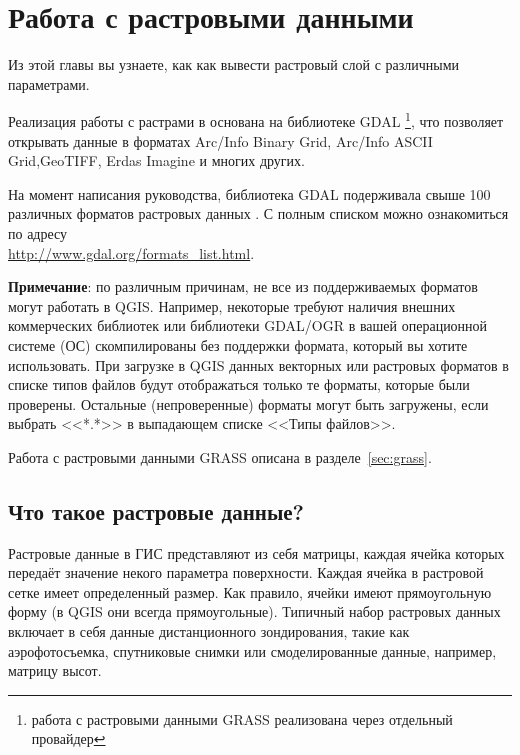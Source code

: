 \chapter{Работа с растровыми данными}\label{label_raster}


Из этой главы вы узнаете, как как вывести растровый слой с различными параметрами.

Реализация работы с растрами в \qg основана на библиотеке GDAL
\footnote{работа с растровыми данными GRASS реализована через отдельный
провайдер}, что позволяет открывать данные в форматах Arc/Info Binary Grid,
Arc/Info ASCII Grid,GeoTIFF,
Erdas Imagine и многих других.

На момент написания руководства, библиотека GDAL подерживала свыше 100
различных форматов растровых данных \cite{GDALweb}. С полным списком можно
ознакомиться по адресу \\
\url{http://www.gdal.org/formats_list.html}.

\textbf{Примечание}: по различным причинам, не все из поддерживаемых
форматов могут работать в QGIS. Например, некоторые требуют наличия
внешних коммерческих библиотек или библиотеки GDAL/OGR в вашей операционной
системе (ОС) скомпилированы без поддержки формата, который вы хотите
использовать. При загрузке в QGIS данных векторных или растровых форматов
в списке типов файлов будут отображаться только те форматы, которые были
проверены. Остальные (непроверенные) форматы могут быть загружены, если
выбрать <<*.*>> в выпадающем списке <<Типы файлов>>.

Работа с растровыми данными GRASS описана в разделе~\ref{sec:grass}.

\section{Что такое растровые данные?}\label{label_whatsraster}

Растровые данные в ГИС представляют из себя матрицы, каждая ячейка которых
передаёт значение некого параметра поверхности. Каждая ячейка в
растровой сетке имеет определенный размер. Как правило, ячейки имеют
прямоугольную форму (в QGIS они всегда прямоугольные). Типичный набор
растровых данных включает в себя данные дистанционного зондирования,
такие как аэрофотосъемка, спутниковые снимки или смоделированные данные,
например, матрицу высот.


